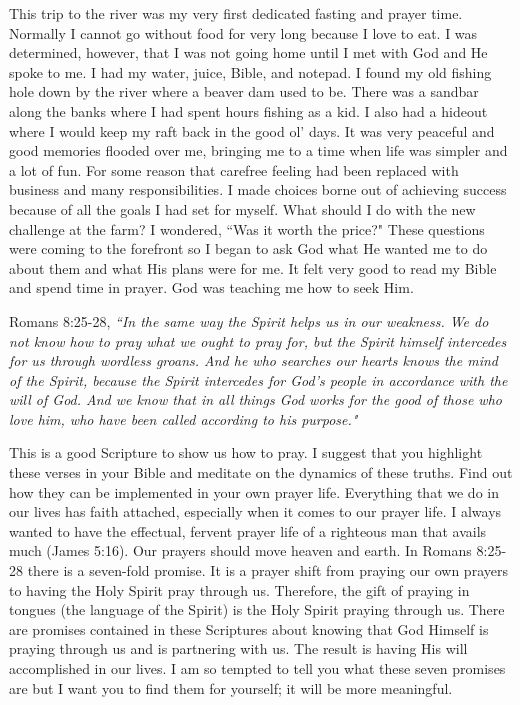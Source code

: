 \documentclass[oneside,12pt]{book}
\begin{document}
This trip to the river was my very first dedicated fasting and prayer time. Normally I cannot go without food for very long because I love to eat. I was determined, however, that I was not going home until I met with God and He spoke to me. I had my water, juice, Bible, and notepad. I found my old fishing hole down by the river where a beaver dam used to be. There was a sandbar along the banks where I had spent hours fishing as a kid. I also had a hideout where I would keep my raft back in the good ol' days. It was very peaceful and good memories flooded over me, bringing me to a time when life was simpler and a lot of fun. For some reason that carefree feeling had been replaced with business and many responsibilities. I made choices borne out of achieving success because of all the goals I had set for myself. What should I do with the new challenge at the farm? I wondered, ``Was it worth the price?" These questions were coming to the forefront so I began to ask God what He wanted me to do about them and what His plans were for me. It felt very good to read my Bible and spend time in prayer. God was teaching me how to seek Him.

Romans 8:25-28, \textit{``In the same way the Spirit helps us in our weakness. We do not know how to pray what we ought to pray for, but the Spirit himself intercedes for us through wordless groans. And he who searches our hearts knows the mind of the Spirit, because the Spirit intercedes for God's people in accordance with the will of God. And we know that in all things God works for the good of those who love him, who have been called according to his purpose."}

This is a good Scripture to show us how to pray. I suggest that you highlight these verses in your Bible and meditate on the dynamics of these truths. Find out how they can be implemented in your own prayer life. Everything that we do in our lives has faith attached, especially when it comes to our prayer life. I always wanted to have the effectual, fervent prayer life of a righteous man that avails much (James 5:16). Our prayers should move heaven and earth. In Romans 8:25-28 there is a seven-fold promise. It is a prayer shift from praying our own prayers to having the Holy Spirit pray through us. Therefore, the gift of praying in tongues (the language of the Spirit) is the Holy Spirit praying through us. There are promises contained in these Scriptures about knowing that God Himself is praying through us and is partnering with us. The result is having His will accomplished in our lives. I am so tempted to tell you what these seven promises are but I want you to find them for yourself; it will be more meaningful.
\end{document}
